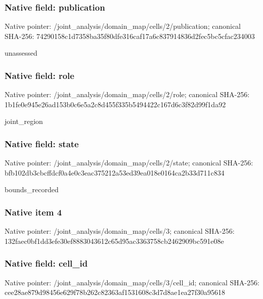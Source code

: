 \documentclass[10pt,a4paper]{article}
\begin{document}
\subsubsection{Native field: publication}


Native pointer: /joint\_analysis/domain\_m\allowbreak{}ap/cells/2/publication; canonical SHA-256: 74290158c1d7358ba35f80df\allowbreak{}e316caf17a6c837914836d2f\allowbreak{}ec5bc5cfac234003


unassessed


\subsubsection{Native field: role}


Native pointer: /joint\_analysis/domain\_map/cells/2/role; canonical SHA-256: 1b1fe0e945e26ad153b0c6e5\allowbreak{}a2c8d455f335b5494422c167\allowbreak{}d6c3f82d99f1da92


joint\_region


\subsubsection{Native field: state}


Native pointer: /joint\_analysis/domain\_m\allowbreak{}ap/cells/2/state; canonical SHA-256: bfb102db3cbcffdcf0a4e0c3\allowbreak{}eac375212a53ed39ea018e01\allowbreak{}64ca2b33d711c834


bounds\_recorded


\subsubsection{Native item 4}


Native pointer: /joint\_analysis/domain\_map/cells/3; canonical SHA-256: 132faec0bf1dd3efe30ef888\allowbreak{}3043612c65d95ac3363758cb\allowbreak{}2462909bc591e08e



\subsubsection{Native field: cell\_id}


Native pointer: /joint\_analysis/domain\_m\allowbreak{}ap/cells/3/cell\_id; canonical SHA-256: cee28ae879d98456e629f78b\allowbreak{}262c82363af1531608c3d7d8\allowbreak{}ae1ea27f30a95618
\end{document}
